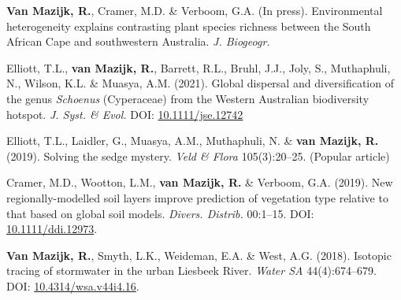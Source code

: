 \begin{hangparas}{2em}{1}

\textbf{Van Mazijk, R.}, Cramer, M.D. \& Verboom, G.A. (In press).
Environmental heterogeneity explains contrasting plant species richness between
the South African Cape and southwestern Australia. \textit{J. Biogeogr.}

Elliott, T.L., \textbf{van Mazijk, R.}, Barrett, R.L., Bruhl, J.J., Joly, S.,
Muthaphuli, N., Wilson, K.L. \& Muasya, A.M. (2021). Global dispersal and
diversification of the genus \textit{Schoenus} (Cyperaceae) from the Western
Australian biodiversity hotspot. \textit{J. Syst. \& Evol.} DOI:
\href{https://doi.org/10.1111/jse.1274}{10.1111/jse.12742}

Elliott, T.L., Laidler, G., Muasya, A.M., Muthaphuli, N. \& \textbf{van Mazijk,
R.} (2019). Solving the sedge mystery. \textit{Veld \& Flora} 105(3):20--25.
(Popular article)

Cramer, M.D., Wootton, L.M., \textbf{van Mazijk, R.} \& Verboom, G.A. (2019).
New regionally-modelled soil layers improve prediction of vegetation type
relative to that based on global soil models. \textit{Divers. Distrib.}
00:1--15. DOI: \href{https://doi.org/10.1111/ddi.12973}{10.1111/ddi.12973}.

\textbf{Van Mazijk, R.}, Smyth, L.K., Weideman, E.A. \& West, A.G. (2018).
Isotopic tracing of stormwater in the urban Liesbeek River. \textit{Water SA}
44(4):674--679. DOI:
\href{https://doi.org/10.4314/wsa.v44i4.16}{10.4314/wsa.v44i4.16}.

\end{hangparas}
